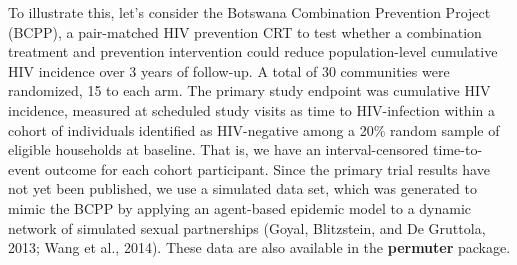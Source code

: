 \documentclass[12pt]{article}\usepackage[]{graphicx}\usepackage[]{color}
\begin{document}
To illustrate this, let's consider the Botswana Combination Prevention Project (BCPP), a pair-matched HIV prevention CRT to test whether a combination treatment and prevention intervention could reduce population-level cumulative HIV incidence over 3 years of follow-up. A total of 30 communities were randomized, 15 to each arm. The primary study endpoint was cumulative HIV incidence, measured at scheduled study visits as time to HIV-infection within a cohort of individuals identified as HIV-negative among a 20\% random sample of eligible households at baseline. That is, we have an interval-censored time-to-event outcome for each cohort participant. Since the primary trial results have not yet been published, we use a simulated data set, which was generated to mimic the BCPP by applying an agent-based epidemic model to a dynamic network of simulated sexual partnerships (Goyal, Blitzstein, and De Gruttola, 2013; Wang et al., 2014). These data are also available in the \textbf{permuter} package.
\end{document}

